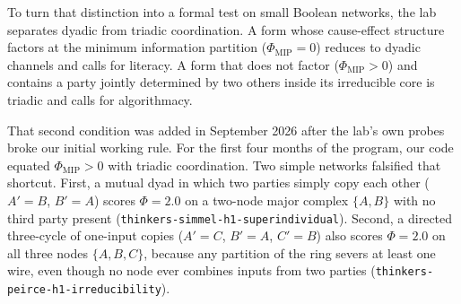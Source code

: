 \documentclass[11pt,a4paper]{article}
\begin{document}
To turn that distinction into a formal test on small Boolean networks, the lab separates dyadic from triadic coordination. A form whose cause-effect structure factors at the minimum information partition ($\Phi_{\mathrm{MIP}} = 0$) reduces to dyadic channels and calls for literacy. A form that does not factor ($\Phi_{\mathrm{MIP}} > 0$) and contains a party jointly determined by two others inside its irreducible core is triadic and calls for algorithmacy.

That second condition was added in September 2026 after the lab's own probes broke our initial working rule. For the first four months of the program, our code equated $\Phi_{\mathrm{MIP}} > 0$ with triadic coordination. Two simple networks falsified that shortcut. First, a mutual dyad in which two parties simply copy each other ($A' = B$, $B' = A$) scores $\Phi = 2.0$ on a two-node major complex $\{A, B\}$ with no third party present (\texttt{thinkers-simmel-h1-superindividual}). Second, a directed three-cycle of one-input copies ($A' = C$, $B' = A$, $C' = B$) also scores $\Phi = 2.0$ on all three nodes $\{A, B, C\}$, because any partition of the ring severs at least one wire, even though no node ever combines inputs from two parties (\texttt{thinkers-peirce-h1-irreducibility}).
\end{document}
